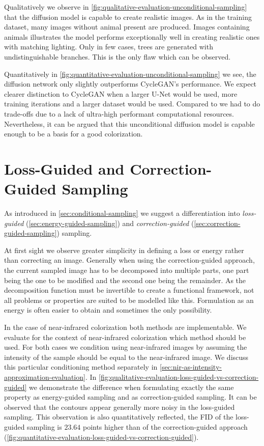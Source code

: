 Qualitatively we observe in \autoref{fig:qualitative-evaluation-unconditional-sampling} that the diffusion model is capable to create realistic images.
As in the training dataset, many images without animal present are produced.
Images containing animals illustrates the model performs exceptionally well in creating realistic ones with matching lighting.
Only in few cases, trees are generated with undistinguishable branches. This is the only flaw which can be observed.

Quantitatively in \autoref{fig:quantitative-evaluation-unconditional-sampling} we see, the diffusion network only slightly outperforms CycleGAN's performance.
We expect clearer distinction to CycleGAN when a larger U-Net would be used, more training iterations and a larger dataset would be used.
Compared to \textcite{diffusion-beats-gans} we had to do trade-offs due to a lack of ultra-high performant computational resources.
Nevertheless, it can be argued that this unconditional diffusion model is capable enough to be a basis for a good colorization.


\section{Loss-Guided and Correction-Guided Sampling}
As introduced in \autoref{sec:conditional-sampling} we suggest a differentiation into
\textit{loss-guided} (\autoref{sec:energy-guided-sampling}) and \textit{correction-guided} (\autoref{sec:correction-guided-sampling}) sampling.

At first sight we observe greater simplicity in defining a loss or energy rather than correcting an image.
Generally when using the correction-guided approach, the current sampled image has to be decomposed into multiple parts,
one part being the one to be modified and the second one being the remainder.
As the decomposition function must be invertible to create a functional framework, not all problems or properties are suited to be modelled like this.
Formulation as an energy is often easier to obtain and sometimes the only possibility.

In the case of near-infrared colorization both methods are implementable.
We evaluate for the context of near-infrared colorization which method should be used.
For both cases we condition using near-infrared images by assuming the intensity of the sample should be equal to the near-infrared image.
We discuss this particular conditioning method separately in \autoref{sec:nir-as-intensity-approximation-evaluation}.
In \autoref{fig:qualitative-evaluation-loss-guided-vs-correction-guided} we demonstrate the difference when formulating exactly the same property as energy-guided sampling and as correction-guided sampling.
It can be observed that the contours appear generally more noisy in the loss-guided sampling.
This observation is also quantitatively reflected, the FID of the loss-guided sampling is $23.64$ points higher than of the correction-guided approach (\autoref{fig:quantitative-evaluation-loss-guided-vs-correction-guided}).

